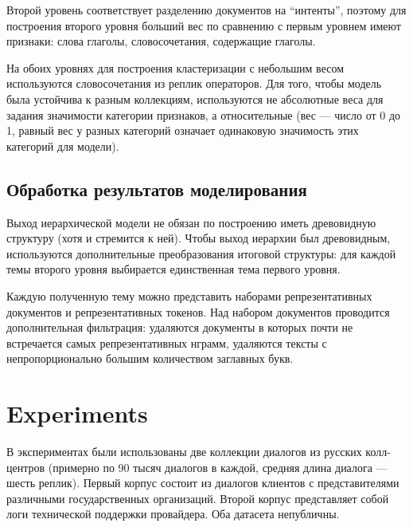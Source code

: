Второй уровень соответствует разделению документов на “интенты”, поэтому для построения второго уровня больший вес по сравнению с первым уровнем имеют признаки: слова глаголы, словосочетания, содержащие глаголы.

На обоих уровнях для построения кластеризации с небольшим весом используются словосочетания из реплик операторов. Для того, чтобы модель была устойчива к разным коллекциям, используются не абсолютные веса для задания значимости категории признаков,  а относительные (вес — число от 0 до 1, равный вес у разных категорий означает одинаковую значимость этих категорий для модели).




\subsection{Обработка результатов моделирования}
Выход иерархической модели не обязан по построению иметь древовидную структуру (хотя и стремится к ней). Чтобы выход иерархии был древовидным, используются дополнительные преобразования итоговой структуры: для каждой темы второго уровня выбирается единственная тема первого уровня. 

Каждую полученную тему можно представить наборами репрезентативных документов и репрезентативных токенов. Над набором документов проводится дополнительная фильтрация: удаляются документы в которых почти не встречается самых репрезентативных нграмм, удаляются тексты с непропорционально большим количеством заглавных букв.


\section{Experiments}

В экспериментах были использованы две коллекции диалогов из русских колл-центров (примерно по 90 тысяч диалогов в каждой, средняя длина диалога --- шесть реплик). Первый корпус состоит из диалогов клиентов с представителями различными государственных организаций. Второй корпус представляет собой логи технической поддержки провайдера. Оба датасета непубличны.

